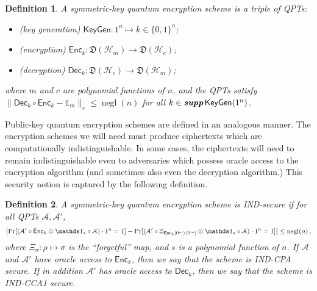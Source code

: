 \documentclass[11pt]{article}
\numberwithin{equation}{section}
\newtheorem{definition}{Definition}
\newcommand{\one}{\mathds 1}
\newcommand{\opn}{\operatorname}
\newcommand{\algo}{\mathcal}
\newcommand{\negl}{\opn{negl}}
\newcommand{\KeyGen}{\ensuremath{\mathsf{KeyGen}}\xspace}
\newcommand{\Enc}{\ensuremath{\mathsf{Enc}}\xspace}
\newcommand{\Dec}{\ensuremath{\mathsf{Dec}}\xspace}
\newcommand{\prob}{\opn{Pr}}
\newcommand{\states}{\mathfrak D}
\newcommand\supp{\textbf{supp}}
\begin{document}
{\begin{definition}\label{def:encryption-scheme}
A symmetric-key quantum encryption scheme is a triple of QPTs:
\begin{itemize}
\item (key generation) $\KeyGen : 1^n \longmapsto k \in \{0, 1\}^n$;
\item (encryption) $\Enc_k : \states (\mathcal H_m) \longrightarrow \states (\mathcal H_c)$;
\item (decryption) $\Dec_k : \states (\mathcal H_c) \longrightarrow \states (\mathcal H_m)$;
\end{itemize}
where $m$ and $c$ are polynomial functions of $n$, and the QPTs satisfy $\| \Dec_k \circ \Enc_k - \one_m \|_\diamond \leq \negl(n)$ for all $k \in \emph{\supp}\,\KeyGen(1^n)$.
\end{definition}

Public-key quantum encryption schemes are defined in an analogous manner. The encryption schemes we will need must produce ciphertexts which are computationally indistinguishable. In some cases, the ciphertexts will need to remain indistinguishable even to adversaries which possess oracle access to the encryption algorithm (and sometimes also even the decryption algorithm.) This security notion is captured by the following definition.

\begin{definition}\label{def:IND}
A symmetric-key quantum encryption scheme is IND-secure if for all QPTs $\algo A, \algo A'$,
$$
\left|\prob[ (\algo A' \circ \Enc_k \otimes \one_s \circ \algo A) \cdot 1^n = 1] -
\prob[ (\algo A' \circ \Xi_{\Enc_k \ket{0^m}\bra{0^m}} \otimes \one_s \circ \algo A) \cdot 1^n = 1] \right|
\leq \negl(n)\,,
$$ 
where $\Xi_\sigma: \rho \mapsto \sigma$ is the ``forgetful'' map, and $s$ is a polynomial function of $n$. If $\algo A$ and $\algo A'$ have oracle access to $\Enc_k$, then we say that the scheme is IND-CPA secure. If in addition $\algo A'$ has oracle access to $\Dec_k$, then we say that the scheme is IND-CCA1 secure.
\end{definition}

}
\end{document}
